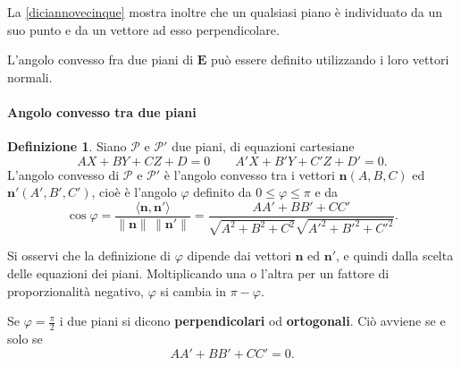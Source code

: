 \documentclass{article}
\theoremstyle{plain}
\theoremstyle{definition}
\newtheorem{defn}{Definizione}[section]
\theoremstyle{remark}
\begin{document}
\vspace{10pt}

La \ref{diciannovecinque} mostra inoltre che un qualsiasi piano è individuato da un suo punto 
e da un vettore ad esso perpendicolare.

\vspace{10pt}

L'angolo convesso fra due piani di $\mathbf{E}$ può essere definito utilizzando i loro vettori normali. 

\vspace{10pt}

\paragraph{Angolo convesso tra due piani}
\begin{bxthm}
\begin{defn}
Siano $\mathscr{P}$ e $\mathscr{P}'$ due piani, di equazioni cartesiane
\[AX + BY + CZ + D = 0\quad\quad A'X + B'Y + C'Z + D' = 0.\]
L'angolo convesso di $\mathscr{P}$ e $\mathscr{P}'$ è l'angolo convesso tra i vettori 
$\mathbf{n}(A,B,C)$ ed $\mathbf{n}'(A',B',C')$, cioè è l'angolo $\varphi$ definito da 
$0 \le \varphi \le \pi$ e da
\begin{equation}\label{diciannovesette}
\cos \varphi = \dfrac{\langle \mathbf{n}, \mathbf{n}' \rangle}
{\|\mathbf{n}\| \, \|\mathbf{n}'\|} = 
\dfrac{AA' + BB' + CC'}{\sqrt{A^2 + B^2 + C^2}\sqrt{A'^2 + B'^2 + C'^2}}.     
\end{equation}    
\end{defn}
\end{bxthm}

\vspace{10pt}

Si osservi che la definizione di $\varphi$ dipende dai vettori $\mathbf{n}$ ed $\mathbf{n}'$, 
e quindi dalla scelta delle equazioni dei piani. 
Moltiplicando una o l'altra per un fattore di proporzionalità negativo, 
$\varphi$ si cambia in $\pi - \varphi$.

\vspace{10pt}

Se $\varphi = \frac{\pi}{2}$ i due piani si dicono \textbf{perpendicolari} od \textbf{ortogonali}. 
Ciò avviene se e solo se
\[
AA' + BB' + CC' = 0.
\]

\vspace{10pt}
\end{document}
